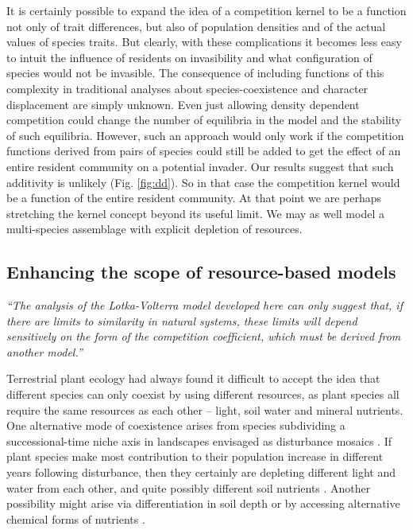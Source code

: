\documentclass[a4paper,11pt]{article}
\begin{document}
It is certainly possible to expand the idea of a competition kernel to
be a function not only of trait differences, but also of population
densities and of the actual values of species traits. But clearly, with these complications it becomes less easy to intuit the influence of residents on invasibility and what configuration of species would not be invasible. The consequence of including functions of
this complexity in traditional analyses about species-coexistence and
character displacement are simply unknown.  Even just allowing density
dependent competition could change the number of equilibria in the
model and the stability of such equilibria.
%
However, such an approach would only work if the competition functions
derived from pairs of species could still be added to get the effect
of an entire resident community on a potential invader.
Our results suggest that such additivity is unlikely
(Fig. \ref{fig:dd}). So in that case the competition kernel would be a
function of the entire resident community.  At that point we are
perhaps stretching the kernel concept beyond its useful limit. We may as well
model a multi-species assemblage with explicit depletion of resources.

\subsection{Enhancing the scope of resource-based models}

\emph{``The analysis of the Lotka-Volterra model developed here can only
suggest that, if there are limits to similarity in natural systems, these
limits will depend sensitively on the form of the competition coefficient,
which must be derived from another model.''}\citep{Abrams-1975}

Terrestrial plant ecology had always found it difficult to accept the
idea that different species can only coexist by using different
resources, as plant species all require the same resources as each other --
light, soil water and mineral nutrients. One alternative mode of coexistence
arises from species subdividing a successional-time niche axis in
landscapes envisaged as disturbance mosaics \citep{Connell-1978}. If
plant species make most contribution to their population increase in
different years following disturbance, then they certainly are
depleting different light and water from each other, and quite
possibly different soil nutrients \citep{Moorcroft-2001}. Another
possibility might arise via differentiation in soil depth or by accessing
alternative chemical forms of nutrients \citep{Tilman-1977}.
\end{document}
